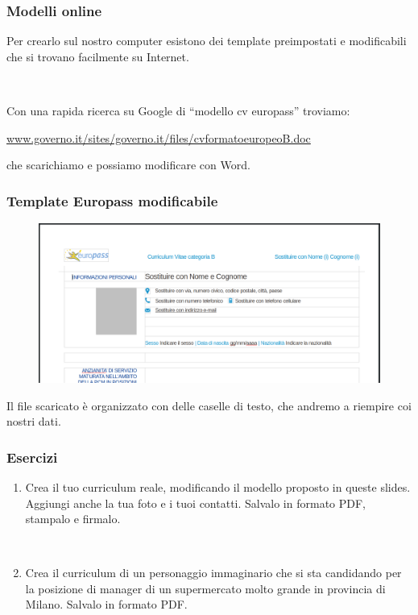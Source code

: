 \documentclass[handout]{beamer}
\begin{document}
\begin{frame}
\frametitle{Modelli online}
Per crearlo sul nostro computer esistono dei \alert{template preimpostati} e modificabili che si trovano facilmente su Internet.\pause

~

Con una rapida ricerca su Google di ``modello cv europass'' troviamo:
\begin{center}
  \href{https://www.governo.it/sites/governo.it/files/cvformatoeuropeoB.doc}{www.governo.it/sites/governo.it/files/cvformatoeuropeoB.doc}
\end{center}
che scarichiamo e possiamo modificare con Word.
\end{frame}

\begin{frame}
\frametitle{Template Europass modificabile}
\begin{figure}
  \includegraphics[width=\columnwidth]{img/cvtemplate.png}
\end{figure}

Il file scaricato è organizzato con delle \alert{caselle di testo}, che andremo a riempire coi nostri dati.
\end{frame}


\begin{frame}
\frametitle{Esercizi}
\begin{enumerate}
  \item Crea il tuo \alert{curriculum reale}, modificando il modello proposto in queste slides. Aggiungi anche la tua foto e i tuoi contatti. Salvalo in formato PDF, stampalo e firmalo.
  
  ~
  \item Crea il curriculum di un \alert{personaggio immaginario} che si sta candidando per la posizione di manager di un supermercato molto grande in provincia di Milano. Salvalo in formato PDF.
\end{enumerate}
\end{frame}
\end{document}
